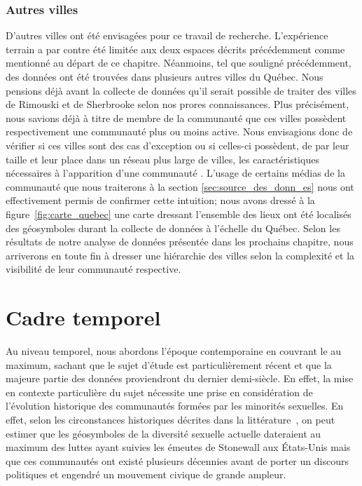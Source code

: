 \subsubsection{Autres villes}
\label{ssub:autres_villes}
D'autres villes ont été envisagées pour ce travail de recherche. 
L'expérience terrain a par contre été limitée aux deux espaces décrits précédemment comme mentionné au départ de ce chapitre. 
Néanmoins, tel que souligné précédemment, des données ont été trouvées dans plusieurs autres villes du Québec. 
Nous pensions déjà avant la collecte de données qu'il serait possible de traiter des villes de Rimouski et de Sherbrooke selon nos prores connaissances. 
Plus précisément, nous savions déjà à titre de membre de la communauté \lgbt{} que ces villes possèdent respectivement une communauté plus ou moins active. 
Nous envisagions donc de vérifier si ces villes sont des cas d'exception ou si celles-ci possèdent, de par leur taille et leur place dans un réseau plus large de villes, les caractéristiques nécessaires à l'apparition d'une communauté \lgbt.
L'usage de certains médias de la communauté que nous traiterons à la section \ref{sec:source_des_donn_es} nous ont effectivement permis de confirmer cette intuition; nous avons dressé à la figure~\ref{fig:carte_quebec} une carte dressant l'ensemble des lieux ont été localisés des géosymboles durant la collecte de données à l'échelle du Québec. 
Selon les résultats de notre analyse de données présentée dans les prochains chapitre, nous arriverons en toute fin à dresser une hiérarchie des villes selon la complexité et la visibilité de leur communauté respective.

\section{Cadre temporel}
\label{sec:cadre_temporel}
Au niveau temporel, nous abordons l'époque contemporaine en couvrant le  au maximum, sachant que le sujet d'étude est particulièrement récent et que la majeure partie des données proviendront du dernier demi-siècle. 
En effet, la mise en contexte particulière du sujet nécessite une prise en considération de l'évolution historique des communautés formées par les minorités sexuelles. 
En effet, selon les circonstances historiques décrites dans la littérature~\citep{Spencer2005}, on peut estimer que les géosymboles de la diversité sexuelle actuelle dateraient au maximum des luttes ayant suivies les émeutes de Stonewall aux États-Unis mais que ces communautés ont existé plusieurs décennies avant de porter un discours politiques et engendré un mouvement civique de grande ampleur.

